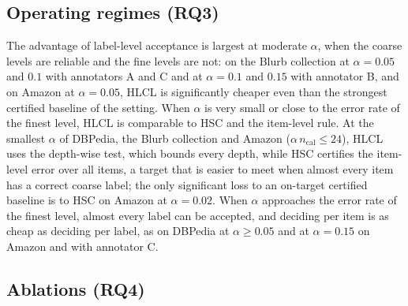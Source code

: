 \documentclass[preprint,12pt]{elsarticle}
\theoremstyle{definition}
\newcommand{\hlcl}{\textup{\textsc{HLCL}}}
\begin{document}
\subsection{Operating regimes (RQ3)}
\label{sec:res-nohelp}
The advantage of label-level acceptance is largest at moderate $\alpha$, when the coarse levels
are reliable and the fine levels are not: on the Blurb collection at $\alpha=0.05$ and $0.1$ with annotators A and C and
at $\alpha=0.1$ and $0.15$ with annotator B, and on Amazon at $\alpha=0.05$,
\hlcl{} is significantly cheaper even than the strongest certified baseline of
the setting. When $\alpha$ is very small or close to the error rate of the
finest level, \hlcl{} is comparable to HSC and the item-level rule. At the
smallest $\alpha$ of DBPedia, the Blurb collection and Amazon
($\alpha\,n_{\mathrm{cal}}\le24$), \hlcl{} uses the depth-wise test, which
bounds every depth, while HSC certifies the item-level error over all items, a
target that is easier to meet when almost every item has a correct coarse
label; the only significant loss to an on-target certified baseline is to HSC
on Amazon at $\alpha=0.02$. When $\alpha$ approaches the error rate of the finest level,
almost every label can be accepted, and deciding per item is as cheap as
deciding per label, as on DBPedia at $\alpha\ge0.05$ and at $\alpha=0.15$ on
Amazon and with annotator C.

\subsection{Ablations (RQ4)}
\label{sec:res-abl}

\begin{table}[!tbp]
\centering
\footnotesize
\setlength{\tabcolsep}{2pt}
\caption{Effort of \hlcl{} variants over 100 splits; lower is better. Bold marks
values within $0.005$ of the best in the row and test group. Each variant is run
with the automatic choice of test (left), with the pooled betting test only
(middle) and with the depth-wise test only (right). This design prevents the
effect of a component from being confounded with the test that happens to be
selected. \emph{vote}: sample agreement (with the stated confidence as a tie-breaker)
instead of the learned score;
\emph{no cl.}: no ancestor closure, with nodes accepted independently;
\emph{tied}: one threshold for all depths. With Nadeau--Bengio-corrected
95\% intervals, the full method and the \emph{vote} or \emph{no cl.} variant
differ significantly in no setting; the \emph{tied} variant differs
significantly in  settings with the automatic test,
 with the pooled test and 
with the depth-wise test.}
\label{tab:abl}

\end{table}
\end{document}
